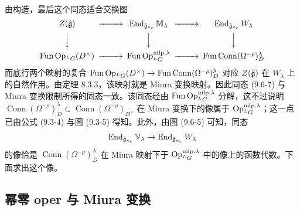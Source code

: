 
由构造，最后这个同态适合交换图
\[
    \begin{CD}
        Z(\gghat) @>>> \operatorname{End}_{\gghat_{\kappa_c}}\mathbb{M}_\lambda
            @>>> \operatorname{End}_{\gghat_{\kappa_c}}W_\lambda\\
        @VVV @VVV @VVV\\
        \operatorname{Fun}\Op_{{}^LG}(D^\times) @>>>
            \operatorname{Fun}\Op^{\mathrm{nilp},\lambda}_{{}^LG} @>>>
            \operatorname{Fun}\operatorname{Conn}(\Omega^{-\rho})^\lambda_D
    \end{CD}
\]
而底行两个映射的复合 $\operatorname{Fun}\operatorname{Op}_{{}^LG}(D^\times)\to\operatorname{Fun}\operatorname{Conn}(\Omega^{-\rho})^\lambda_D$ 对应 $Z(\hat{\mathfrak{g}})$ 在 $W_\lambda$ 上的自然作用。由定理 8.3.3，该映射就是 Miura 变换映射。因此同态 (9.6-7) 与 Miura 变换限制所得的同态一致。该同态经由 $\operatorname{Fun}\operatorname{Op}^{\mathrm{nilp},\lambda}_{{}^LG}$ 分解，这不过说明 $\operatorname{Conn}(\Omega^{-\rho})^\lambda_D\subset\operatorname{Conn}(\Omega^{-\rho})_{D^\times}$ 在 Miura 变换下的像属于 $\operatorname{Op}^{\mathrm{nilp},\lambda}_{{}^LG}$；这一点已由公式 (9.3-4) 与图 (9.3-5) 得知。此外，由图 (9.6-5) 可知，同态
\[
    \operatorname{End}_{\hat{\mathfrak{g}}_{\kappa_c}}\mathbb{V}_\lambda\to\operatorname{End}_{\hat{\mathfrak{g}}_{\kappa_c}}W_\lambda
\]
的像恰是 $\operatorname{Conn}(\Omega^{-\rho})^\lambda_D$ 在 Miura 映射下于 $\operatorname{Op}^{\mathrm{nilp},\lambda}_{{}^LG}$ 中的像上的函数代数。下面求出这个像。

\subsection{幂零 oper 与 Miura 变换}

